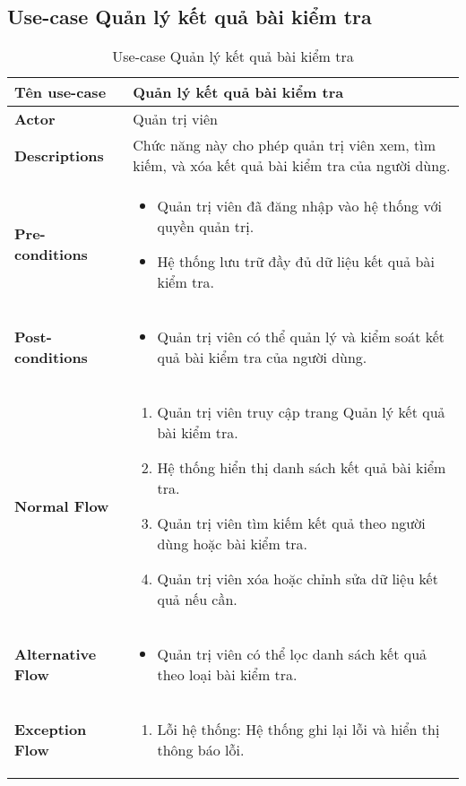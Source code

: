\subsection{Use-case Quản lý kết quả bài kiểm tra}
\begin{longtable}[H]{|l|p{}|}
    \caption{Use-case Quản lý kết quả bài kiểm tra} \\
    \hline
    \textbf{Tên use-case} & Quản lý kết quả bài kiểm tra \\
    \hline
    \textbf{Actor} & Quản trị viên \\
    \hline
    \textbf{Descriptions} & Chức năng này cho phép quản trị viên xem, tìm kiếm, và xóa kết quả bài kiểm tra của người dùng. \\
    \hline
    \textbf{Pre-conditions} & \vspace{-0.75cm}
    \begin{itemize}[leftmargin=4mm]
        \item Quản trị viên đã đăng nhập vào hệ thống với quyền quản trị.
        \item Hệ thống lưu trữ đầy đủ dữ liệu kết quả bài kiểm tra.
    \end{itemize} \\
    \hline
    \textbf{Post-conditions} & \vspace{-0.75cm}
    \begin{itemize}[leftmargin=4mm]
        \item Quản trị viên có thể quản lý và kiểm soát kết quả bài kiểm tra của người dùng.
    \end{itemize} \\
    \hline
    \textbf{Normal Flow} &  \vspace{-0.75cm}
    \begin{enumerate}[leftmargin=5.5mm]
        \item Quản trị viên truy cập trang Quản lý kết quả bài kiểm tra.
        \item Hệ thống hiển thị danh sách kết quả bài kiểm tra.
        \item Quản trị viên tìm kiếm kết quả theo người dùng hoặc bài kiểm tra.
        \item Quản trị viên xóa hoặc chỉnh sửa dữ liệu kết quả nếu cần.
    \end{enumerate} \\
    \hline
    \textbf{Alternative Flow} & \vspace{-0.75cm}
    \begin{itemize}[leftmargin=4mm]
        \item Quản trị viên có thể lọc danh sách kết quả theo loại bài kiểm tra.
    \end{itemize} \\
    \hline
    \textbf{Exception Flow} & \vspace{-0.75cm}
    \begin{enumerate}[leftmargin=5.5mm]
        \item Lỗi hệ thống: Hệ thống ghi lại lỗi và hiển thị thông báo lỗi.
    \end{enumerate} \\
    \hline
\end{longtable}
